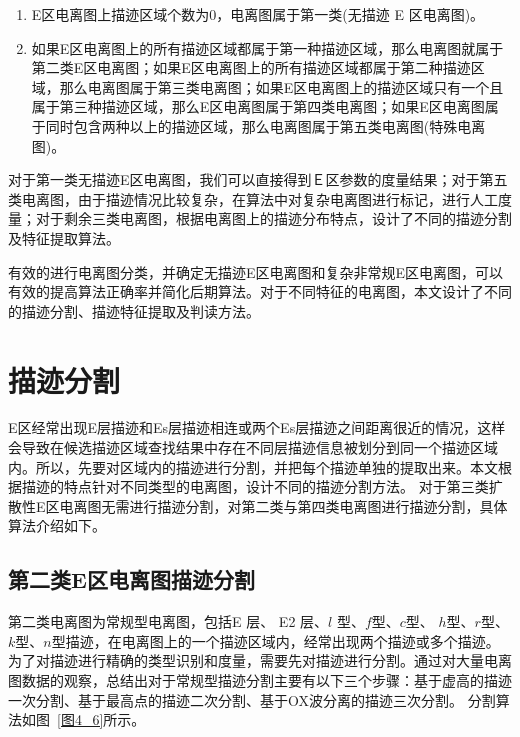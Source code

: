 \begin{enumerate} 
\item E区电离图上描迹区域个数为0，电离图属于第一类(无描迹 E 区电离图)。

\item 如果E区电离图上的所有描迹区域都属于第一种描迹区域，那么电离图就属于第二类E区电离图；如果E区电离图上的所有描迹区域都属于第二种描迹区域，那么电离图属于第三类电离图；如果E区电离图上的描迹区域只有一个且属于第三种描迹区域，那么E区电离图属于第四类电离图；如果E区电离图属于同时包含两种以上的描迹区域，那么电离图属于第五类电离图(特殊电离图)。
\end{enumerate} 

对于第一类无描迹E区电离图，我们可以直接得到Ｅ区参数的度量结果；对于第五类电离图，由于描迹情况比较复杂，在算法中对复杂电离图进行标记，进行人工度量；对于剩余三类电离图，根据电离图上的描迹分布特点，设计了不同的描迹分割及特征提取算法。

有效的进行电离图分类，并确定无描迹E区电离图和复杂非常规E区电离图，可以有效的提高算法正确率并简化后期算法。对于不同特征的电离图，本文设计了不同的描迹分割、描迹特征提取及判读方法。

\section{描迹分割}
\label{4_4}

E区经常出现E层描迹和Es层描迹相连或两个Es层描迹之间距离很近的情况，这样会导致在候选描迹区域查找结果中存在不同层描迹信息被划分到同一个描迹区域内。所以，先要对区域内的描迹进行分割，并把每个描迹单独的提取出来。本文根据描迹的特点针对不同类型的电离图，设计不同的描迹分割方法。 对于第三类扩散性E区电离图无需进行描迹分割，对第二类与第四类电离图进行描迹分割，具体算法介绍如下。

\subsection{第二类E区电离图描迹分割}
\label{4_4_1}

第二类电离图为常规型电离图，包括E 层、 E2 层、$l$ 型、$f$型、$c$型、 $h$型、$r$型、$k$型、$n$型描迹，在电离图上的一个描迹区域内，经常出现两个描迹或多个描迹。为了对描迹进行精确的类型识别和度量，需要先对描迹进行分割。通过对大量电离图数据的观察，总结出对于常规型描迹分割主要有以下三个步骤：基于虚高的描迹一次分割、基于最高点的描迹二次分割、基于OX波分离的描迹三次分割。 分割算法如图~\ref{图4_6}所示。

